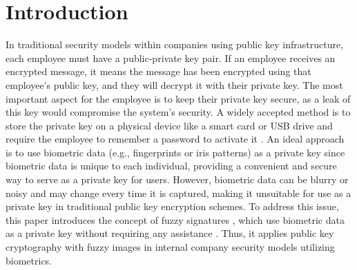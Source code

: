 \documentclass[graybox]{svmult}
\begin{document}
\section{Introduction}
In traditional security models within companies using public key infrastructure, each employee must have a public-private key pair. If an employee receives an encrypted message, it means the message has been encrypted using that employee's public key, and they will decrypt it with their private key. The most important aspect for the employee is to keep their private key secure, as a leak of this key would compromise the system's security. A widely accepted method is to store the private key on a physical device like a smart card or USB drive and require the employee to remember a password to activate it \cite{Ellison2000}.
An ideal approach is to use biometric data (e.g., fingerprints or iris patterns) \cite{Connaughton2007} as a private key since biometric data is unique to each individual, providing a convenient and secure way to serve as a private key for users. However, biometric data can be blurry or noisy and may change every time it is captured, making it unsuitable for use as a private key in traditional public key encryption schemes.
To address this issue, this paper introduces the concept of fuzzy signatures \cite{Takahashi2015}, which use biometric data as a private key without requiring any assistance \cite{Dodis2008}. Thus, it applies public key cryptography with fuzzy images \cite{Son2016} in internal company security models utilizing biometrics.
\end{document}
